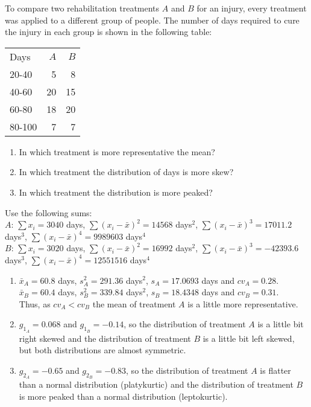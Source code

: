 {To compare two rehabilitation treatments $A$ and $B$ for an injury, every treatment was applied to a different
group of people. The number of days required to cure the injury in each group is shown in the following table:
\begin{center}
\begin{tabular}{lrr}
\toprule
Days & $A$ & $B$ \\
20-40 & 5 & 8 \\
40-60 & 20 & 15 \\
60-80 & 18 & 20 \\
80-100 & 7 & 7 \\
\bottomrule
\end{tabular}
\end{center}

\begin{enumerate}
\item In which treatment is more representative the mean?
\item In which treatment the distribution of days is more skew?
\item In which treatment the distribution is more peaked?
\end{enumerate}

Use the following sums:\\
$A$: $\sum x_i= 3040$ days, $\sum (x_i-\bar x)^2=14568$ days$^2$, $\sum (x_i-\bar x)^3=17011.2$ days$^3$, $\sum
(x_i-\bar x)^4=9989603$ days$^4$\\
$B$: $\sum x_i= 3020$ days, $\sum (x_i-\bar x)^2=16992$ days$^2$, $\sum (x_i-\bar x)^3=-42393.6$ days$^3$, $\sum
(x_i-\bar x)^4=12551516$ days$^4$
}
{\begin{enumerate}
\item $\bar x_A=60.8$ days, $s^2_A=291.36$ days$^2$, $s_A=17.0693$ days and $cv_A = 0.28$.\\
$\bar x_B=60.4$ days, $s^2_B=339.84$ days$^2$, $s_B=18.4348$ days and $cv_B = 0.31$.\\
Thus, as $cv_A<cv_B$ the mean of treatment $A$ is a little more representative.
\item $g_{1_A} = 0.068$ and $g_{1_B} = -0.14$, so the distribution of treatment $A$ is a little bit right skewed and the distribution of treatment $B$ is a little bit left skewed, but both distributions are almost symmetric.
\item $g_{2_A}=-0.65$ and $g_{2_B}=-0.83$, so the distribution of treatment $A$ is flatter than a normal distribution (platykurtic) and the distribution of treatment $B$ is more peaked than a normal distribution (leptokurtic).
\end{enumerate}
}
{}


